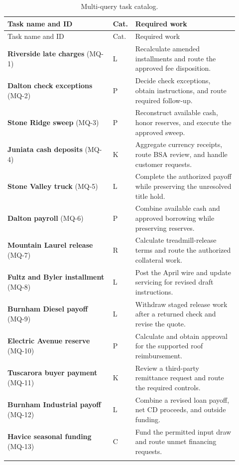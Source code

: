\documentclass[11pt,letterpaper]{article}
\begin{document}
\begin{longtable}{@{}p{0.44\linewidth}p{0.05\linewidth}p{0.43\linewidth}@{}}
\caption{Multi-query task catalog.}\\
\toprule Task name and ID & Cat. & Required work\\\midrule\endfirsthead
\toprule Task name and ID & Cat. & Required work\\\midrule\endhead
\textbf{Riverside late charges} (MQ-1) & L & Recalculate amended installments and route the approved fee disposition.\\\addlinespace
\textbf{Dalton check exceptions} (MQ-2) & P & Decide check exceptions, obtain instructions, and route required follow-up.\\\addlinespace
\textbf{Stone Ridge sweep} (MQ-3) & P & Reconstruct available cash, honor reserves, and execute the approved sweep.\\\addlinespace
\textbf{Juniata cash deposits} (MQ-4) & K & Aggregate currency receipts, route BSA review, and handle customer requests.\\\addlinespace
\textbf{Stone Valley truck} (MQ-5) & L & Complete the authorized payoff while preserving the unresolved title hold.\\\addlinespace
\textbf{Dalton payroll} (MQ-6) & P & Combine available cash and approved borrowing while preserving reserves.\\\addlinespace
\textbf{Mountain Laurel release} (MQ-7) & R & Calculate treadmill-release terms and route the authorized collateral work.\\\addlinespace
\textbf{Fultz and Byler installment} (MQ-8) & L & Post the April wire and update servicing for revised draft instructions.\\\addlinespace
\textbf{Burnham Diesel payoff} (MQ-9) & L & Withdraw staged release work after a returned check and revise the quote.\\\addlinespace
\textbf{Electric Avenue reserve} (MQ-10) & P & Calculate and obtain approval for the supported roof reimbursement.\\\addlinespace
\textbf{Tuscarora buyer payment} (MQ-11) & K & Review a third-party remittance request and route the required controls.\\\addlinespace
\textbf{Burnham Industrial payoff} (MQ-12) & L & Combine a revised loan payoff, net CD proceeds, and outside funding.\\\addlinespace
\textbf{Havice seasonal funding} (MQ-13) & C & Fund the permitted input draw and route unmet financing requests.\\\addlinespace

\end{longtable}
\end{document}
